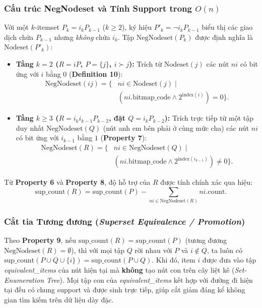 \documentclass[conference]{IEEEtran}
\begin{document}
\subsubsection{Cấu trúc NegNodeset và Tính Support trong $O(n)$}
Với một $k$-itemset $P_k = i_k P_{k-1}$ ($k \ge 2$), ký hiệu $P'_k = \neg i_k P_{k-1}$ biểu thị các giao dịch chứa $P_{k-1}$ nhưng \textit{không} chứa $i_k$. Tập $\text{NegNodeset}(P_k)$ được định nghĩa là $\text{Nodeset}(P'_k)$:
\begin{itemize}
    \item \textbf{Tầng $k = 2$ ($R = i P$, $P = \{j\}$, $i \succ j$):} Trích từ $\text{Nodeset}(j)$ các nút $\mathit{ni}$ có bit ứng với $i$ bằng $0$ (\textbf{Definition 10}):
    \begin{equation}
    \begin{aligned}
    \text{NegNodeset}(ij) = \bigl\{&\mathit{ni} \in \text{Nodeset}(j) \mid \\
    &(\mathit{ni}.\text{bitmap\_code} \land 2^{\text{index}(i)}) = 0\bigr\}.
    \end{aligned}
    \label{eq:level2}
    \end{equation}
    \item \textbf{Tầng $k \ge 3$ ($R = i_k i_{k-1} P_{k-2}$, đặt $Q = i_k P_{k-2}$):} Trích trực tiếp từ một tập duy nhất $\text{NegNodeset}(Q)$ (nút anh em bên phải ở cùng mức cha) các nút $\mathit{ni}$ có bit ứng với $i_{k-1}$ bằng $1$ (\textbf{Property 7}):
    \begin{equation}
    \begin{aligned}
    \text{NegNodeset}(R) = \bigl\{&\mathit{ni} \in \text{NegNodeset}(Q) \mid \\
    &(\mathit{ni}.\text{bitmap\_code} \land 2^{\text{index}(i_{k-1})}) \neq 0\bigr\}.
    \end{aligned}
    \label{eq:levelk}
    \end{equation}
\end{itemize}
Từ \textbf{Property 6} và \textbf{Property 8}, độ hỗ trợ của $R$ được tính chính xác qua hiệu:
\begin{equation}
\text{sup\_count}(R) = \text{sup\_count}(P) - \sum_{\mathit{ni} \in \text{NegNodeset}(R)} \mathit{ni}.\text{count}.
\label{eq:sup_diff}
\end{equation}

\subsubsection{Cắt tỉa Tương đương (\textit{Superset Equivalence / Promotion})}
Theo \textbf{Property 9}, nếu $\text{sup\_count}(R) = \text{sup\_count}(P)$ (tương đương $\text{NegNodeset}(R) = \emptyset$), thì với mọi tập $Q$ rời nhau với $P$ và $i \notin Q$, ta luôn có $\text{sup\_count}(P \cup Q \cup \{i\}) = \text{sup\_count}(P \cup Q)$. Khi đó, item $i$ được đưa vào tập \textit{equivalent\_items} của nút hiện tại mà \textbf{không} tạo nút con trên cây liệt kê (\textit{Set-Enumeration Tree}). Mọi tập con của \textit{equivalent\_items} kết hợp với đường đi hiện tại đều có chung support và được sinh trực tiếp, giúp cắt giảm đáng kể không gian tìm kiếm trên dữ liệu dày đặc.
\end{document}
